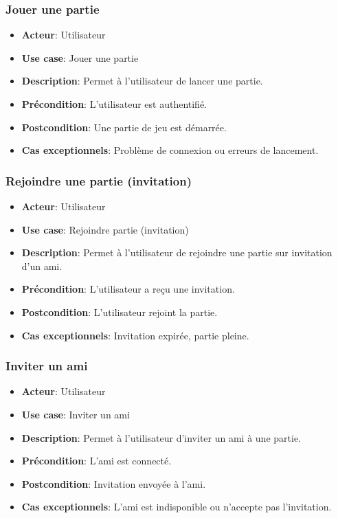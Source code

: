 \documentclass{article}
\begin{document}
\subsubsection*{Jouer une partie}
\begin{itemize}
    \item \textbf{Acteur}: Utilisateur
    \item \textbf{Use case}: Jouer une partie
    \item \textbf{Description}: Permet à l'utilisateur de lancer une partie.
    \item \textbf{Précondition}: L'utilisateur est authentifié.
    \item \textbf{Postcondition}: Une partie de jeu est démarrée.
    \item \textbf{Cas exceptionnels}: Problème de connexion ou erreurs de lancement.
\end{itemize}

\subsubsection*{Rejoindre une partie (invitation)}
\begin{itemize}
    \item \textbf{Acteur}: Utilisateur
    \item \textbf{Use case}: Rejoindre partie (invitation)
    \item \textbf{Description}: Permet à l'utilisateur de rejoindre une partie sur invitation d'un ami.
    \item \textbf{Précondition}: L'utilisateur a reçu une invitation.
    \item \textbf{Postcondition}: L'utilisateur rejoint la partie.
    \item \textbf{Cas exceptionnels}: Invitation expirée, partie pleine.
\end{itemize}

\subsubsection*{Inviter un ami}
\begin{itemize}
    \item \textbf{Acteur}: Utilisateur
    \item \textbf{Use case}: Inviter un ami
    \item \textbf{Description}: Permet à l'utilisateur d'inviter un ami à une partie.
    \item \textbf{Précondition}: L'ami est connecté.
    \item \textbf{Postcondition}: Invitation envoyée à l'ami.
    \item \textbf{Cas exceptionnels}: L'ami est indisponible ou n'accepte pas l'invitation.
\end{itemize}
\end{document}
